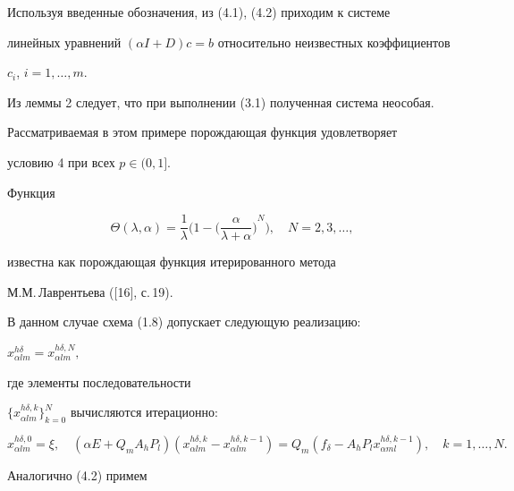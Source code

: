 \begin{exam}
Используя введенные обозначения, из (4.1), (4.2) приходим к системе


линейных уравнений $(\alpha I +D)c=b$ относительно неизвестных коэффициентов


$c_i$, $i=1,\dotsc,m$.


Из леммы 2 следует, что при выполнении (3.1) полученная система неособая.





Рассматриваемая в этом примере порождающая функция удовлетворяет


условию 4 при всех $p \in (0, 1]$.


\end{exam}





\begin{exam}


Функция


$$


\Theta(\lambda, \alpha)=\frac{1}{\lambda}


\bigg( 1-{ \bigg(\frac{\alpha}{\lambda + \alpha} \bigg)}^N \bigg),


\quad N=2, 3, \dotsc,


$$


известна как порождающая функция итерированного метода


М.М.\,Лаврентьева ([16], с.\,19).


В данном случае схема (1.8) допускает следующую реализацию:


$ x_{\alpha l m}^{h \delta}=x_{\alpha l m}^{h \delta, N},$


где элементы последовательности


$\{ x_{\alpha l m}^{h \delta, k} \}^N_{k=0}$ вычисляются итерационно:


\begin{equation}


x_{\alpha l m}^{h \delta, 0}= \xi, \quad


(\alpha E+ Q_m A_h P_l)(x_{\alpha l m}^{h \delta, k} -


x_{\alpha l m}^{h \delta, k-1})=


Q_m(f_{\delta}- A_h P_l x_{\alpha m l}^{h \delta, k-1}),


\quad k=1, \dotsc, N.


\tag{4.4}


\end{equation}


Аналогично (4.2) примем



\end{exam}
